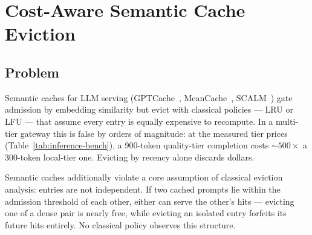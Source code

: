 
\section{Cost-Aware Semantic Cache Eviction}
\label{sec:eviction}

\subsection{Problem}
Semantic caches for LLM serving (GPTCache~\cite{gptcache2023},
MeanCache~\cite{meancache2024}, SCALM~\cite{scalm2024}) gate admission by
embedding similarity but evict with classical policies --- LRU or LFU ---
that assume every entry is equally expensive to recompute. In a
multi-tier gateway this is false by orders of magnitude: at the measured
tier prices (Table~\ref{tab:inference-bench}), a 900-token quality-tier
completion costs ${\sim}500\times$ a 300-token local-tier one. Evicting
by recency alone discards dollars.

Semantic caches additionally violate a core assumption of classical
eviction analysis: entries are not independent. If two cached prompts lie
within the admission threshold of each other, either can serve the
other's hits --- evicting one of a dense pair is nearly free, while
evicting an isolated entry forfeits its future hits entirely. No
classical policy observes this structure.

